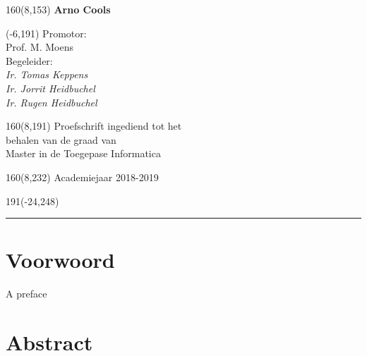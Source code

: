 \documentclass[12pt,a4paper,oneside]{book}
\begin{document}
\begin{textblock}{160}(8,153)
\textblockcolour{}
\vspace{-\parskip}
\flushright
\fontsize{14}{16}\selectfont \textbf{Arno Cools}
\end{textblock}
%
\begin{textblock}{70}(-6,191)
\textblockcolour{}
\vspace{-\parskip}
\flushleft
Promotor:\\Prof. M. Moens\\[-2pt]
\vspace{5mm}
Begeleider:\\
\textsl{Ir. Tomas Keppens\\Ir. Jorrit Heidbuchel\\Ir. Rugen Heidbuchel}\\[-2pt]
\end{textblock}
%
\begin{textblock}{160}(8,191)
\textblockcolour{}
\vspace{-\parskip}
\flushright
Proefschrift ingediend tot het\\[4.5pt]
behalen van de graad van\\[4.5pt]
Master in de Toegepase Informatica\\
\end{textblock}
%
\begin{textblock}{160}(8,232)
\textblockcolour{}
\vspace{-\parskip}
\flushright
Academiejaar 2018-2019
\end{textblock}
%
\begin{textblock}{191}(-24,248)
{\color{blueline}\rule{550pt}{5.5pt}}
\end{textblock}
%
\vfill
\newpage

\rmfamily
\frontmatter
{}
\setcounter{page}{0}
\chapter{Voorwoord}

A preface

\chapter{Abstract}
\end{document}
